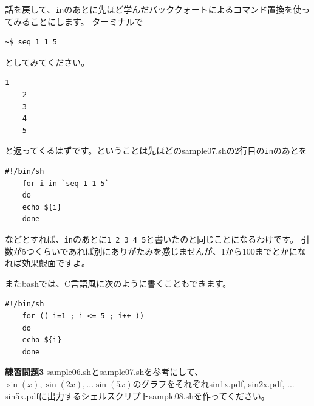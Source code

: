 \documentclass[a4j]{ltjreport}
\begin{document}
    話を戻して、\texttt{in}のあとに先ほど学んだバッククォートによるコマンド置換を使ってみることにします。
    ターミナルで
    \begin{lstlisting}[numbers=none]
        ~$ seq 1 1 5
    \end{lstlisting}
    としてみてください。
    \begin{lstlisting}[numbers=none]
    1
    2
    3
    4
    5
    \end{lstlisting}
    と返ってくるはずです。ということは先ほどのsample07.shの2行目の\texttt{in}のあとを
    \begin{lstlisting}[caption=sample07.sh 改2]
    #!/bin/sh
    for i in `seq 1 1 5`
    do
    echo ${i}
    done
    \end{lstlisting}
    などとすれば、\texttt{in}のあとに\texttt{1 2 3 4 5}と書いたのと同じことになるわけです。
    引数が5つくらいであれば別にありがたみを感じませんが、1から100までとかになれば効果覿面ですよ。

    またbashでは、C言語風に次のように書くこともできます。
    \begin{lstlisting}[caption=sample07.sh 改3]
    #!/bin/sh
    for (( i=1 ; i <= 5 ; i++ ))
    do
    echo ${i}
    done
    \end{lstlisting}


    \begin{itembox}[l]{\textbf{練習問題3}}
        sample06.shとsample07.shを参考にして、$\sin(x), \sin(2x), ... \sin(5x)$のグラフをそれぞれsin1x.pdf, sin2x.pdf, ... sin5x.pdfに出力するシェルスクリプトsample08.shを作ってください。
    \end{itembox}
\end{document}

